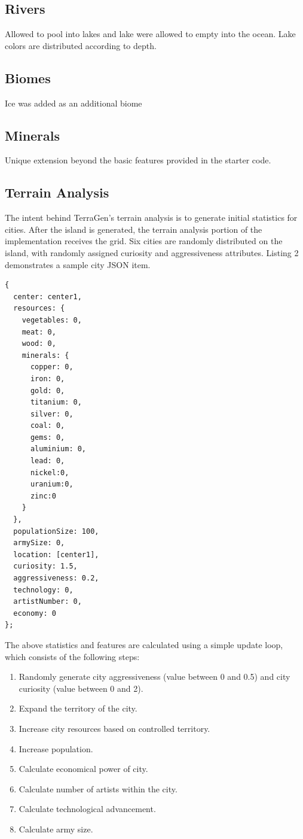 \subsection{Rivers}
Allowed to pool into lakes and lake were allowed to empty into the ocean. Lake colors are distributed according to depth.

\subsection{Biomes}
Ice was added as an additional biome

\subsection{Minerals}
Unique extension beyond the basic features provided in the starter code. 

\subsection{Terrain Analysis}
The intent behind TerraGen's terrain analysis is to generate initial statistics for cities. After the island is generated, the terrain analysis portion of the implementation receives the grid. Six cities are randomly distributed on the island, with randomly assigned curiosity and aggressiveness attributes. Listing 2 demonstrates a sample city JSON item.

\begin{lstlisting}[caption=JSON City Item]
{
  center: center1,
  resources: {
    vegetables: 0,
    meat: 0,
    wood: 0,
    minerals: {
      copper: 0,
      iron: 0,
      gold: 0,
      titanium: 0,
      silver: 0,
      coal: 0,
      gems: 0,
      aluminium: 0,
      lead: 0,
      nickel:0,
      uranium:0,
      zinc:0
    }
  },
  populationSize: 100,
  armySize: 0,
  location: [center1],
  curiosity: 1.5,
  aggressiveness: 0.2,
  technology: 0,
  artistNumber: 0,
  economy: 0
};
\end{lstlisting}

The above statistics and features are calculated using a simple update loop, which consists of the following steps:

\begin{enumerate}
\item Randomly generate city aggressiveness (value between 0 and 0.5) and city curiosity (value between 0 and 2).
\item Expand the territory of the city.
\item Increase city resources based on controlled territory.
\item Increase population.
\item Calculate economical power of city.
\item Calculate number of artists within the city.
\item Calculate technological advancement.
\item Calculate army size.
\end{enumerate}

